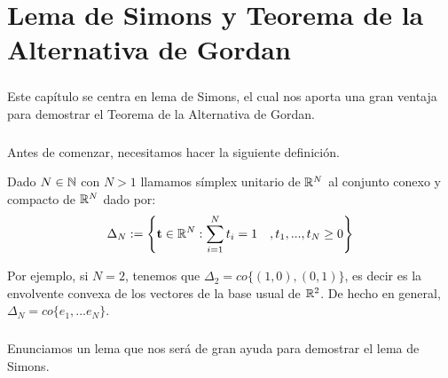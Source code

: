 \chapter{Lema de Simons y Teorema de la Alternativa de Gordan}
	\thispagestyle{empty}
	\paragraph{}Este capítulo se centra en lema de Simons, el cual nos aporta una gran ventaja para demostrar el Teorema de la Alternativa de Gordan.

	\paragraph{}Antes de comenzar, necesitamos hacer la siguiente definición.
	
	\begin{definicion}
		Dado $ N \in \mathbb{N} $ con $ N > 1 $ llamamos símplex unitario de $ \mathbb{R}^N $ al conjunto conexo y compacto de $ \mathbb{R}^N $ dado por:
		\begin{equation*}
			\Delta_N := \left\lbrace \mathbf{t} \in \mathbb{R}^N: \sum_{i=1}^{N}{t_i} = 1\quad , t_1,...,t_N \geq 0 \right\rbrace
		\end{equation*}
	\end{definicion}

	Por ejemplo, si $ N = 2 $, tenemos que $ \Delta_2 = co\{(1,0),(0,1)\}$, es decir es la envolvente convexa de los vectores de la base usual de $ \mathbb{R}^2 $. De hecho en general, $ \Delta_N = co\{e_1,...e_N\} $.

	\paragraph{} Enunciamos un lema que nos será de gran ayuda para demostrar el lema de Simons.
	
